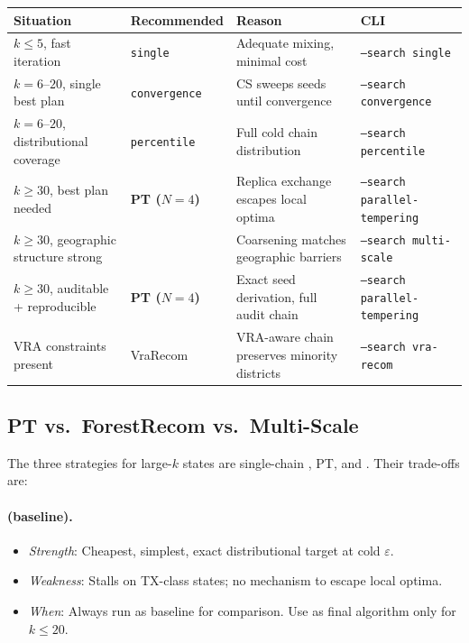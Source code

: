 \begin{center}
\renewcommand{\arraystretch}{1.25}
\begin{tabular}{@{}llll@{}}
\toprule
Situation & Recommended & Reason & CLI \\
\midrule
$k \le 5$, fast iteration
  & \texttt{single}
  & Adequate mixing, minimal cost
  & \texttt{--search single} \\
$k = 6$--$20$, single best plan
  & \texttt{convergence}
  & CS sweeps seeds until convergence
  & \texttt{--search convergence} \\
$k = 6$--$20$, distributional coverage
  & \texttt{percentile}
  & Full cold chain distribution
  & \texttt{--search percentile} \\
$k \ge 30$, best plan needed
  & \textbf{PT ($N=4$)}
  & Replica exchange escapes local optima
  & \texttt{--search parallel-tempering} \\
$k \ge 30$, geographic structure strong
  & \ms{}
  & Coarsening matches geographic barriers
  & \texttt{--search multi-scale} \\
$k \ge 30$, auditable + reproducible
  & \textbf{PT ($N=4$)}
  & Exact seed derivation, full audit chain
  & \texttt{--search parallel-tempering} \\
VRA constraints present
  & VraRecom
  & VRA-aware chain preserves minority districts
  & \texttt{--search vra-recom} \\
\bottomrule
\end{tabular}
\end{center}

\subsection{PT vs.\ ForestRecom vs.\ Multi-Scale}

The three strategies for large-$k$ states are single-chain \fr{}, PT, and \ms{}.
Their trade-offs are:

\paragraph{\fr{} (baseline).}
\begin{itemize}
\item \emph{Strength}: Cheapest, simplest, exact distributional target at cold $\varepsilon$.
\item \emph{Weakness}: Stalls on TX-class states; no mechanism to escape local optima.
\item \emph{When}: Always run as baseline for comparison. Use as final algorithm
  only for $k \le 20$.
\end{itemize}

